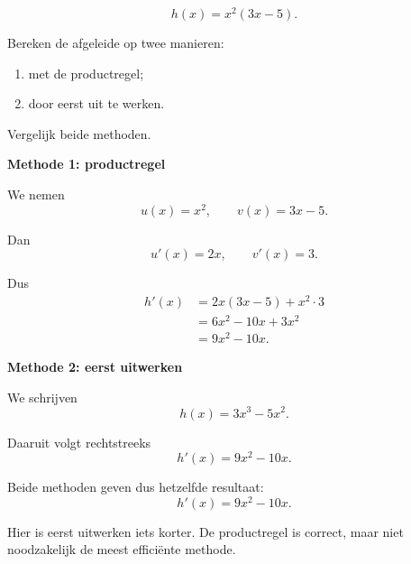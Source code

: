 \documentclass{ximera}
\begin{document}
\begin{oefening}{\oefB\ESS}
\begin{question}
  \end{question}
  
  
  \begin{question}
  
  \[
  h(x)=x^2(3x-5).
  \]
  
  Bereken de afgeleide op twee manieren:
  
  \begin{enumerate}
    \item met de productregel;
    \item door eerst uit te werken.
  \end{enumerate}
  
  Vergelijk beide methoden.
  
  \begin{oplossing}
  \textbf{Methode 1: productregel}
  
  We nemen
  \[
  u(x)=x^2,
  \qquad
  v(x)=3x-5.
  \]
  
  Dan
  \[
  u'(x)=2x,
  \qquad
  v'(x)=3.
  \]
  
  Dus
  \[
  \begin{aligned}
  h'(x)
  &=2x(3x-5)+x^2\cdot3\\
  &=6x^2-10x+3x^2\\
  &=9x^2-10x.
  \end{aligned}
  \]
  
  \textbf{Methode 2: eerst uitwerken}
  
  We schrijven
  \[
  h(x)=3x^3-5x^2.
  \]
  
  Daaruit volgt rechtstreeks
  \[
  h'(x)=9x^2-10x.
  \]
  
  Beide methoden geven dus hetzelfde resultaat:
  \[
  \boxed{h'(x)=9x^2-10x}.
  \]
  
  Hier is eerst uitwerken iets korter. De productregel is correct,
  maar niet noodzakelijk de meest efficiënte methode.
  \end{oplossing}
  
  \end{question}
  
  \end{oefening}
  
  
  
\end{document}
